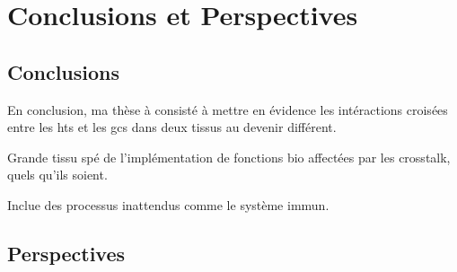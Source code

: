 \documentclass[../main.tex]{subfiles}
\begin{document}
\chapter{Conclusions et Perspectives}

\section{Conclusions}

En conclusion, ma thèse à consisté à mettre en évidence les intéractions croisées entre les \glspl{ht} et les \glspl{gc} dans deux tissus au devenir différent.

Grande tissu spé de l'implémentation de fonctions bio affectées par les crosstalk, quels qu'ils soient.

Inclue des processus inattendus comme le système immun.


\section{Perspectives}
\end{document}
